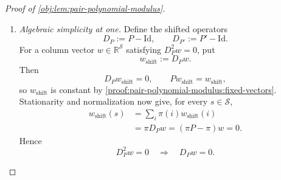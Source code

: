 \begin{proof}[Proof of \cref{obj:lem:pair-polynomial-modulus}]
\begin{enumerate}
For polynomial matrix evaluation, use the convention
\[
F(z)=\sum_{k=0}^{n_F}F_kz^k\in\mathbb R[z],
\qquad n_F\in\mathbb N,\qquad
F(P):=\sum_{k=0}^{n_F}F_kP^k.
\]
Stationarity and induction give
\[
\pi P^k=\pi\quad(k\in\mathbb N),
\qquad
\pi F(P)=\sum_{k=0}^{n_F}F_k\pi P^k=F(1)\pi.
\]
Cayley--Hamilton, together with the characteristic factorization, yields
\[
(P-\mathrm{Id})q_P(P)=\chi_P(P)=0.
\]
Each column of \(q_P(P)\) therefore belongs to the fixed space established above.
Since each column is constant and \(\sum_s\pi(s)=1\), for every \(i,j\in\mathcal S\),
\[
[q_P(P)]_{ij}
=\sum_s\pi(s)[q_P(P)]_{sj}
=[\pi q_P(P)]_j
=q_P(1)\pi(j).
\]
With the rank-one matrix defined by
\[
(\mathbf1\pi)_{ij}:=\pi(j)\quad(i,j\in\mathcal S),
\]
this says
\[
q_P(P)=q_P(1)\mathbf1\pi.
\]
Multiplying by \(q_{P'}(P)\) and using polynomial stationarity gives
\[
\begin{aligned}
Q_{P,P'}(P)
&=q_P(P)q_{P'}(P)\\
&=q_P(1)\mathbf1\bigl(\pi q_{P'}(P)\bigr)\\
&=q_P(1)q_{P'}(1)\mathbf1\pi
=Q_{P,P'}(1)\mathbf1\pi.
\end{aligned}
\]
Applying the same calculation to \(P'\), with the polynomial factors in the opposite order, gives
\[
Q_{P,P'}(P')=Q_{P,P'}(1)\mathbf1\pi'.
\]

Since the initial vectors have total mass one, these projection identities imply
\[
\nu Q_{P,P'}(P)r=Q_{P,P'}(1)\pi r,
\qquad
\nu'Q_{P,P'}(P')r'=Q_{P,P'}(1)\pi'r'.
\]
On the other hand, expanding the polynomial of degree at most six gives
\[
\nu Q_{P,P'}(P)r=\sum_{k=0}^6Q_k\nu P^kr,
\qquad
\nu'Q_{P,P'}(P')r'=\sum_{k=0}^6Q_k\nu'P'^kr'.
\]
Subtracting proves
\[
Q_{P,P'}(1)(\pi r-\pi'r')
=\sum_{k=0}^6Q_k\bigl(\nu P^kr-\nu'P'^kr'\bigr).
\]

\item \emph{Algebraic simplicity at one.}
Define the shifted operators
\[
D_P:=P-\mathrm{Id},\qquad D_{P'}:=P'-\mathrm{Id}.
\]
For a column vector \(w\in\mathbb R^{\mathcal S}\) satisfying \(D_P^2w=0\), put
\[
w_{\mathrm{shift}}:=D_Pw.
\]
Then
\[
D_Pw_{\mathrm{shift}}=0,\qquad
Pw_{\mathrm{shift}}=w_{\mathrm{shift}},
\]
so \(w_{\mathrm{shift}}\) is constant by \cref{proof:pair-polynomial-modulus:fixed-vectors}.
Stationarity and normalization now give, for every \(s\in\mathcal S\),
\[
\begin{aligned}
w_{\mathrm{shift}}(s)
&=\sum_i\pi(i)w_{\mathrm{shift}}(i)\\
&=\pi D_Pw
=(\pi P-\pi)w=0.
\end{aligned}
\]
Hence
\[
D_P^2w=0\quad\Longrightarrow\quad D_Pw=0.
\]


\end{enumerate}
\end{proof}
